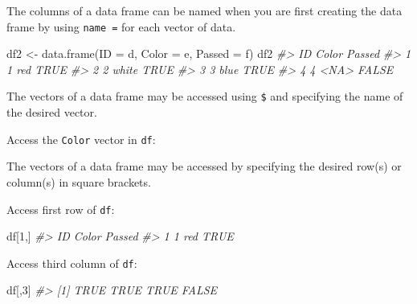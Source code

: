 \documentclass[
]{article}
\newenvironment{Shaded}{\begin{snugshade}}{\end{snugshade}}
\newcommand{\AttributeTok}[1]{\textcolor[rgb]{0.77,0.63,0.00}{#1}}
\newcommand{\CommentTok}[1]{\textcolor[rgb]{0.56,0.35,0.01}{\textit{#1}}}
\newcommand{\DecValTok}[1]{\textcolor[rgb]{0.00,0.00,0.81}{#1}}
\newcommand{\FunctionTok}[1]{\textcolor[rgb]{0.00,0.00,0.00}{#1}}
\newcommand{\NormalTok}[1]{#1}
\newcommand{\OtherTok}[1]{\textcolor[rgb]{0.56,0.35,0.01}{#1}}
\newcommand{\SpecialCharTok}[1]{\textcolor[rgb]{0.00,0.00,0.00}{#1}}
\begin{document}
The columns of a data frame can be named when you are first creating the
data frame by using \texttt{name\ =} for each vector of data.

\begin{Shaded}
\begin{Highlighting}[]
\NormalTok{df2 }\OtherTok{\textless{}{-}} \FunctionTok{data.frame}\NormalTok{(}\AttributeTok{ID =}\NormalTok{ d, }\AttributeTok{Color =}\NormalTok{ e, }\AttributeTok{Passed =}\NormalTok{ f)}
\NormalTok{df2}
\CommentTok{\#\textgreater{}   ID Color Passed}
\CommentTok{\#\textgreater{} 1  1   red   TRUE}
\CommentTok{\#\textgreater{} 2  2 white   TRUE}
\CommentTok{\#\textgreater{} 3  3  blue   TRUE}
\CommentTok{\#\textgreater{} 4  4  \textless{}NA\textgreater{}  FALSE}
\end{Highlighting}
\end{Shaded}

The vectors of a data frame may be accessed using \texttt{\$} and
specifying the name of the desired vector.

Access the \texttt{Color} vector in \texttt{df}:

\begin{Shaded}
\end{Shaded}

The vectors of a data frame may be accessed by specifying the desired
row(s) or column(s) in square brackets.

Access first row of \texttt{df}:

\begin{Shaded}
\begin{Highlighting}[]
\NormalTok{df[}\DecValTok{1}\NormalTok{,]}
\CommentTok{\#\textgreater{}   ID Color Passed}
\CommentTok{\#\textgreater{} 1  1   red   TRUE}
\end{Highlighting}
\end{Shaded}

Access third column of \texttt{df}:

\begin{Shaded}
\begin{Highlighting}[]
\NormalTok{df[,}\DecValTok{3}\NormalTok{]}
\CommentTok{\#\textgreater{} [1]  TRUE  TRUE  TRUE FALSE}
\end{Highlighting}
\end{Shaded}
\end{document}
